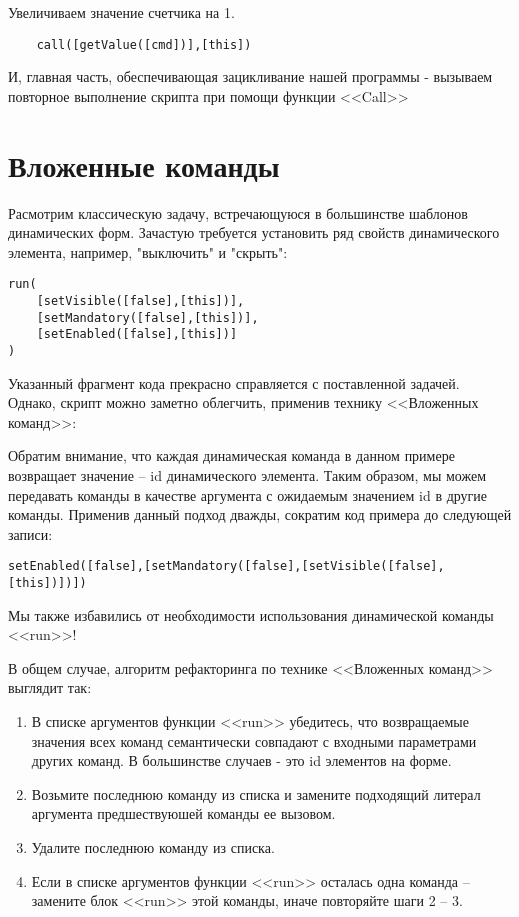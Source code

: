 \documentclass[../index.tex]{subfiles}
\begin{document}
    Увеличиваем значение счетчика на 1.
    
    \begin{verbatim}
    call([getValue([cmd])],[this])
    \end{verbatim}
    
    И, главная часть, обеспечивающая зацикливание нашей программы - вызываем повторное выполнение скрипта при помощи функции
    <<Call>>


\section{Вложенные команды}

Расмотрим классическую задачу, встречающуюся в большинстве шаблонов динамических форм. Зачастую требуется установить ряд свойств динамического элемента, например, "выключить" и "скрыть":
\begin{verbatim}
run(
    [setVisible([false],[this])],
    [setMandatory([false],[this])],
    [setEnabled([false],[this])]
)
\end{verbatim}

Указанный фрагмент кода прекрасно справляется с поставленной задачей. Однако, скрипт можно заметно облегчить, применив технику <<Вложенных команд>>:

Обратим внимание, что каждая динамическая команда в данном примере возвращает значение -- id динамического элемента. Таким образом, мы можем передавать команды в качестве аргумента с ожидаемым значением id в другие команды. Применив данный подход
дважды, сократим код примера до следующей записи:

\begin{verbatim}
setEnabled([false],[setMandatory([false],[setVisible([false],[this])])])
\end{verbatim}

Мы также избавились от необходимости использования динамической команды <<run>>!

В общем случае, алгоритм рефакторинга по технике <<Вложенных команд>> выглядит так:

\begin{enumerate}
	\item В списке аргументов функции <<run>> убедитесь, что возвращаемые значения всех команд семантически совпадают с входными параметрами других команд. В большинстве случаев - это id элементов на форме.
	\item Возьмите последнюю команду из списка и замените подходящий литерал аргумента предшествуюшей команды ее вызовом.
	\item Удалите последнюю команду из списка.
	\item Если в списке аргументов функции <<run>> осталась одна команда -- замените блок <<run>> этой команды, иначе повторяйте шаги 2 -- 3.
\end{enumerate}
\end{document}
